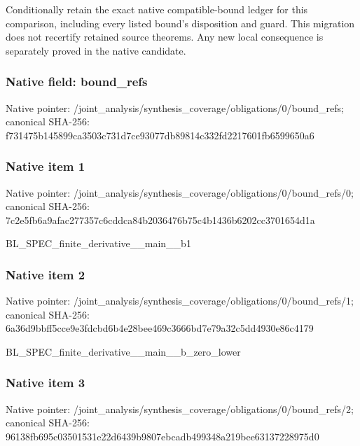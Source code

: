 \documentclass[10pt,a4paper]{article}
\begin{document}
\begingroup\raggedright\sloppy Conditionally retain the exact native compatible-bound ledger for this comparison,\allowbreak{} including every listed bound's disposition and guard. This migration does not recertify retained source theorems. Any new local consequence is separately proved in the native candidate.\par\endgroup

\subsubsection{Native field: bound\_\allowbreak{}refs}
Native pointer: /joint\_\allowbreak{}analysis/synthesis\_\allowbreak{}coverage/obligations/0/bound\_\allowbreak{}refs; canonical SHA-256: f731475b145899ca3503c731d7ce93077db89814c332fd2217601fb6599650a6

\subsubsection{Native item 1}
Native pointer: /joint\_\allowbreak{}analysis/synthesis\_\allowbreak{}coverage/obligations/0/bound\_\allowbreak{}refs/0; canonical SHA-256: 7c2e5fb6a9afac277357c6cddca84b2036476b75c4b1436b6202cc3701654d1a

\begingroup\raggedright\sloppy BL\_\allowbreak{}SPEC\_\allowbreak{}finite\_\allowbreak{}derivative\_\allowbreak{}\_\allowbreak{}main\_\allowbreak{}\_\allowbreak{}b1\par\endgroup

\subsubsection{Native item 2}
Native pointer: /joint\_\allowbreak{}analysis/synthesis\_\allowbreak{}coverage/obligations/0/bound\_\allowbreak{}refs/1; canonical SHA-256: 6a36d9bbff5cce9e3fdcbd6b4e28bee469c3666bd7e79a32c5dd4930e86c4179

\begingroup\raggedright\sloppy BL\_\allowbreak{}SPEC\_\allowbreak{}finite\_\allowbreak{}derivative\_\allowbreak{}\_\allowbreak{}main\_\allowbreak{}\_\allowbreak{}b\_\allowbreak{}zero\_\allowbreak{}lower\par\endgroup

\subsubsection{Native item 3}
Native pointer: /joint\_\allowbreak{}analysis/synthesis\_\allowbreak{}coverage/obligations/0/bound\_\allowbreak{}refs/2; canonical SHA-256: 96138fb695c03501531e22d6439b9807ebcadb499348a219bee63137228975d0
\end{document}
